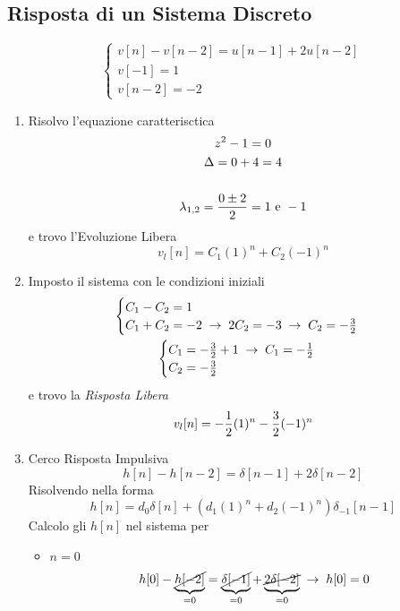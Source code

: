\documentclass{article}
\begin{document}
		\subsection{Risposta di un Sistema Discreto}
			\[
				\begin{cases}
					v[n]-v[n-2]=u[n-1]+2u[n-2] \\
					v[-1] = 1 \\
					v[n-2] = -2
				\end{cases}
			\]
			\begin{enumerate}
				\item Risolvo l'equazione caratterisctica
					  \[
					  	\begin{gathered}
					  		z^2 - 1 = 0 \\
							\Delta = 0 + 4 = 4 \\
							\\
							\lambda_{1,2} = {{0 \pm 2}\over{2}} = 1 \text{ e } -1
 					  	\end{gathered}
					  \]
					  e trovo l'Evoluzione Libera
					  \[
					  	v_l[n] = C_1(1)^n + C_2(-1)^n
					  \]
				\item Imposto il sistema con le condizioni iniziali
					  \[
					  	\begin{gathered}
							\begin{cases}
								C_1 - C_2 = 1 \\
								C_1 + C_2 = -2\; \rightarrow\; 2C_2 = -3\; \rightarrow\; C_2 = -{{3}\over{2}}
							\end{cases} \\
					  		\begin{cases}
					  			C_1 = -{{3}\over{2}} + 1\; \rightarrow\; C_1 = -{{1}\over{2}} \\
								C_2 = -{{3}\over{2}}
					  		\end{cases}
					  	\end{gathered}
					  \]
					  e trovo la \textit{Risposta Libera}
					  \[
					  	v_l[n] = -{{1}\over{2}}(1)^n - {{3}\over{2}}(-1)^n
					  \]
				\item Cerco Risposta Impulsiva
					  \[
					  	h[n] - h[n - 2] = \delta[n - 1] + 2\delta[n - 2]
					  \]
					  Risolvendo nella forma
					  \[
					  	h[n] = d_0\delta[n] + (d_1(1)^n + d_2(-1)^n)\delta_{-1}[n - 1]
					  \]
					  Calcolo gli $ h[n] $ nel sistema per
					  \begin{itemize}
					  	\item \textbf{$ n=0 $}
							  \[
							  	h[0] - \underbrace{\cancel{h[-2]}}_{=0} = \underbrace{\cancel{\delta[-1]}}_{=0} + \underbrace{\cancel{2\delta[-2]}}_{=0}\; \rightarrow\; h[0] = 0
\]
\end{itemize}
\end{enumerate}
\end{document}
